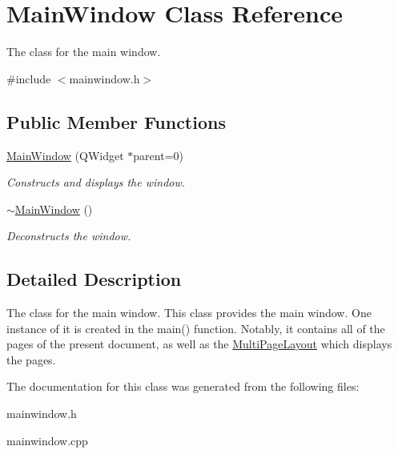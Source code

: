 \hypertarget{class_main_window}{
\section{MainWindow Class Reference}
\label{class_main_window}
}


The class for the main window.  




{\ttfamily \#include $<$mainwindow.h$>$}

\subsection*{Public Member Functions}
\begin{DoxyCompactItemize}
\item 
\hypertarget{class_main_window_a8b244be8b7b7db1b08de2a2acb9409db}{
\hyperlink{class_main_window_a8b244be8b7b7db1b08de2a2acb9409db}{MainWindow} (QWidget $\ast$parent=0)}
\label{class_main_window_a8b244be8b7b7db1b08de2a2acb9409db}

\begin{DoxyCompactList}\small\item\em Constructs and displays the window. \item\end{DoxyCompactList}\item 
\hypertarget{class_main_window_ae98d00a93bc118200eeef9f9bba1dba7}{
\hyperlink{class_main_window_ae98d00a93bc118200eeef9f9bba1dba7}{$\sim$MainWindow} ()}
\label{class_main_window_ae98d00a93bc118200eeef9f9bba1dba7}

\begin{DoxyCompactList}\small\item\em Deconstructs the window. \item\end{DoxyCompactList}\end{DoxyCompactItemize}


\subsection{Detailed Description}
The class for the main window. This class provides the main window. One instance of it is created in the main() function. Notably, it contains all of the pages of the present document, as well as the \hyperlink{class_multi_page_layout}{MultiPageLayout} which displays the pages. 

The documentation for this class was generated from the following files:\begin{DoxyCompactItemize}
\item 
mainwindow.h\item 
mainwindow.cpp\end{DoxyCompactItemize}
